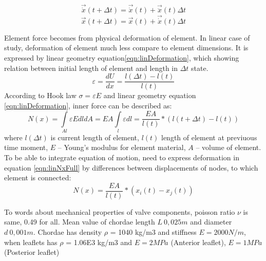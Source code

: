 \begin{equation}\label{eqn:Velos}
  \vec{\dot{x}}(t +\Delta t)=\vec{\dot{x}}(t)+\vec{\ddot{x}}(t)\Delta t
\end{equation}
\begin{equation}\label{eqn:Displ}
  \vec{x}(t +\Delta t)=\vec{x}(t)+\vec{\dot{x}}(t)\Delta t
\end{equation}
\par Element force becomes from physical deformation of
element. In linear case of study, deformation of element much less compare to
element dimensions. It is expressed by linear geometry
equation\eqref{eqn:linDeformation}, which showing relation between initial
length of element and length in $\Delta t$ state.
\begin{equation}\label{eqn:linDeformation}
  \varepsilon=\frac{dU}{dx}=\frac{l(\Delta t)-l(t)}{l(t)}
\end{equation}
According to Hook law $\sigma=\varepsilon E$ and linear geometry equation
\eqref{eqn:linDeformation}, inner force can be described as:
\begin{equation}\label{eqn:linNxFull}
  N(x)= \int\limits_{Al} \varepsilon EdldA=EA\int\limits_l \varepsilon dl=\frac{EA}{l(t)}*(l(t + \Delta t)-l(t))
\end{equation}
where $l(\Delta t)$ is current length of element, $l(t)$ length of element at previuous time moment,
$E$ – Young’s modulus for element material, $A$ – volume of element. To be able to integrate
equation of motion, need to express deformation in equation \eqref{eqn:linNxFull} by differences
between displacements of nodes, to which element is connected:
\begin{equation}\label{eqn:linNxWdispl}
  N(x)=\frac{EA}{l(t)}*(x_{i}(t)-x_{j}(t))
\end{equation}\par
To words about mechanical properties of valve components, poisson ratio $\nu$ is same, 0.49 for all.
Mean value of chordae length $L ~ 0,025 m$ and diameter $d ~ 0,001 m$. Chordae has density $\rho$
= 1040 kg/m3 and stiffness $E = 2000 N/m$, when leaflets has $\rho$ = 1.06E3 kg/m3 and 
$E = 2 MPa$ (Anterior leaflet), $E = 1 MPa$ (Posterior leaflet)\par
